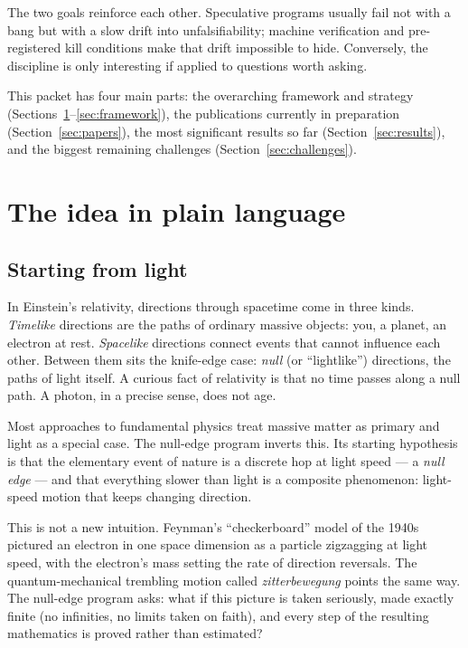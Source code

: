 \documentclass[11pt]{article}
\begin{document}
The two goals reinforce each other.  Speculative programs usually fail not
with a bang but with a slow drift into unfalsifiability; machine
verification and pre-registered kill conditions make that drift impossible
to hide.  Conversely, the discipline is only interesting if applied to
questions worth asking.

This packet has four main parts: the overarching framework and strategy
(Sections~\ref{sec:idea}--\ref{sec:framework}), the publications currently
in preparation (Section~\ref{sec:papers}), the most significant results so
far (Section~\ref{sec:results}), and the biggest remaining challenges
(Section~\ref{sec:challenges}).

\section{The idea in plain language}\label{sec:idea}

\subsection{Starting from light}

In Einstein's relativity, directions through spacetime come in three
kinds.  \emph{Timelike} directions are the paths of ordinary massive
objects: you, a planet, an electron at rest.  \emph{Spacelike} directions
connect events that cannot influence each other.  Between them sits the
knife-edge case: \emph{null} (or ``lightlike'') directions, the paths of
light itself.  A curious fact of relativity is that no time passes along a
null path.  A photon, in a precise sense, does not age.

Most approaches to fundamental physics treat massive matter as primary and
light as a special case.  The null-edge program inverts this.  Its
starting hypothesis is that the elementary event of nature is a discrete
hop at light speed --- a \emph{null edge} --- and that everything slower
than light is a composite phenomenon: light-speed motion that keeps
changing direction.

This is not a new intuition.  Feynman's ``checkerboard'' model of the
1940s pictured an electron in one space dimension as a particle zigzagging
at light speed, with the electron's mass setting the rate of direction
reversals.  The quantum-mechanical trembling motion called
\emph{zitterbewegung} points the same way.  The null-edge program asks:
what if this picture is taken seriously, made exactly finite (no
infinities, no limits taken on faith), and every step of the resulting
mathematics is proved rather than estimated?
\end{document}
